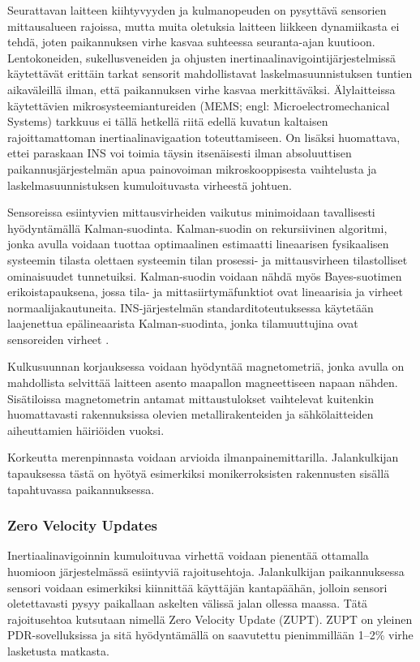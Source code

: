 Seurattavan laitteen kiihtyvyyden ja kulmanopeuden on pysyttävä sensorien
mittausalueen rajoissa, mutta muita oletuksia laitteen liikkeen dynamiikasta ei
tehdä, joten paikannuksen virhe kasvaa suhteessa seuranta-ajan kuutioon.
Lentokoneiden, sukellusveneiden ja ohjusten inertinaalinavigointijärjestelmissä
käytettävät erittäin tarkat sensorit mahdollistavat laskelmasuunnistuksen
tuntien aikaväleillä ilman, että paikannuksen virhe kasvaa merkittäväksi.
Älylaitteissa käytettävien mikrosysteemiantureiden (MEMS; engl:
Microelectromechanical Systems) tarkkuus ei tällä hetkellä riitä edellä kuvatun
kaltaisen rajoittamattoman inertiaalinavigaation toteuttamiseen. On lisäksi
huomattava, ettei paraskaan INS voi toimia täysin itsenäisesti ilman
absoluuttisen paikannusjärjestelmän apua painovoiman mikroskooppisesta
vaihtelusta ja laskelmasuunnistuksen kumuloituvasta virheestä johtuen.

Sensoreissa esiintyvien mittausvirheiden vaikutus minimoidaan tavallisesti
hyödyntämällä Kalman-suodinta.  Kalman-suodin on rekursiivinen algoritmi, jonka
avulla voidaan tuottaa optimaalinen estimaatti lineaarisen fysikaalisen
systeemin tilasta olettaen systeemin tilan prosessi- ja mittausvirheen
tilastolliset ominaisuudet tunnetuiksi. Kalman-suodin voidaan nähdä myös
Bayes-suotimen erikoistapauksena, jossa tila- ja mittasiirtymäfunktiot ovat
lineaarisia ja virheet normaalijakautuneita. INS-järjestelmän
standarditoteutuksessa käytetään laajenettua epälineaarista Kalman-suodinta,
jonka tilamuuttujina ovat sensoreiden virheet \cite{foxlin2005}.

Kulkusuunnan korjauksessa voidaan hyödyntää magnetometriä, jonka avulla on
mahdollista selvittää laitteen asento maapallon magneettiseen napaan nähden.
Sisätiloissa magnetometrin antamat mittaustulokset vaihtelevat kuitenkin
huomattavasti rakennuksissa olevien metallirakenteiden ja sähkölaitteiden
aiheuttamien häiriöiden vuoksi.

Korkeutta merenpinnasta voidaan arvioida ilmanpainemittarilla. Jalankulkijan
tapauksessa tästä on hyötyä esimerkiksi monikerroksisten rakennusten sisällä
tapahtuvassa paikannuksessa.

\subsubsection{Zero Velocity Updates}

Inertiaalinavigoinnin kumuloituvaa virhettä voidaan pienentää ottamalla
huomioon järjestelmässä esiintyviä rajoitusehtoja. Jalankulkijan paikannuksessa
sensori voidaan esimerkiksi kiinnittää käyttäjän kantapäähän, jolloin sensori
oletettavasti pysyy paikallaan askelten välissä jalan ollessa maassa.  Tätä
rajoitusehtoa kutsutaan nimellä Zero Velocity Update (ZUPT).  ZUPT on yleinen
PDR-sovelluksissa ja sitä hyödyntämällä on saavutettu pienimmillään 1--2\%
virhe lasketusta matkasta.

